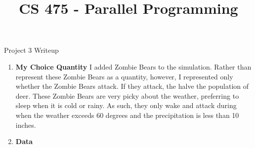 \documentclass[11pt,letterpaper]{article}
\begin{document}
 \univlogo

\title{CS 475 - Parallel Programming}
{\Huge Project 3 Writeup}\\[5mm]

\begin{enumerate}
  \item \textbf{My Choice Quantity} 
        I added Zombie Bears to the simulation. Rather than represent these Zombie
        Bears as a quantity, however, I represented only whether the Zombie Bears
        attack. If they attack, the halve the population of deer. These Zombie 
        Bears are very picky about the weather, preferring to sleep when it
        is cold or rainy. As such, they only wake and attack 
        during when the weather exceeds 60 degrees and the precipitation is
        less than 10 inches.
    
  \item \textbf{Data} 
    \begin{lstlisting}


\end{lstlisting}
\end{enumerate}
\end{document}
